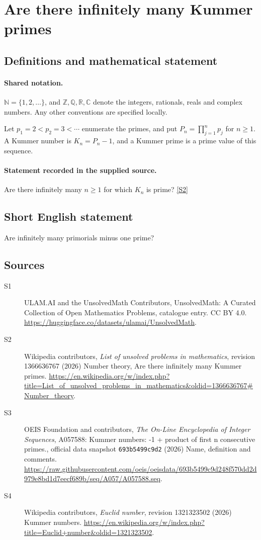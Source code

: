 \documentclass[11pt]{article}
\newcommand{\sref}[2]{\hyperlink{source:#1:#2}{[S#2]}}
\begin{document}
\section{Are there infinitely many Kummer primes}\label{statement}

\subsection{Definitions and mathematical statement}

\paragraph{Shared notation.}$\mathbb N=\{1,2,\ldots\}$, and $\mathbb Z,\mathbb Q,\mathbb R,\mathbb C$ denote the integers, rationals, reals and complex numbers. Any other conventions are specified locally.


Let $p_1=2<p_2=3<\cdots$ enumerate the primes, and put $P_n=\prod_{j=1}^n p_j$ for $n\ge1$. A Kummer number is $K_n=P_n-1$, and a Kummer prime is a prime value of this sequence.
\paragraph{Statement recorded in the supplied source.}
Are there infinitely many $n\ge1$ for which $K_n$ is prime? \sref{statement}{2}
\subsection{Short English statement}
Are infinitely many primorials minus one prime?
\subsection{Sources}
\begin{description}
\item[\hypertarget{source:statement:1}{S1}] ULAM.AI and the UnsolvedMath Contributors, UnsolvedMath: A Curated Collection of Open Mathematics Problems, catalogue entry. CC BY 4.0. \url{https://huggingface.co/datasets/ulamai/UnsolvedMath}.
\item[\hypertarget{source:statement:2}{S2}] Wikipedia contributors, \emph{List of unsolved problems in mathematics}, revision 1366636767 (2026) Number theory, Are there infinitely many Kummer primes. \url{https://en.wikipedia.org/w/index.php?title=List_of_unsolved_problems_in_mathematics&oldid=1366636767#Number_theory}.
\item[\hypertarget{source:statement:3}{S3}] OEIS Foundation and contributors, \emph{The On-Line Encyclopedia of Integer Sequences}, A057588: Kummer numbers: -1 + product of first n consecutive primes., official data snapshot \texttt{693b5499c9d2} (2026) Name, definition and comments. \url{https://raw.githubusercontent.com/oeis/oeisdata/693b5499c9d248f570dd2d979e8bd1d7eecf689b/seq/A057/A057588.seq}.
\item[\hypertarget{source:statement:4}{S4}] Wikipedia contributors, \emph{Euclid number}, revision 1321323502 (2026) Kummer numbers. \url{https://en.wikipedia.org/w/index.php?title=Euclid+number&oldid=1321323502}.
\end{description}
\label{end:statement}
\end{document}
